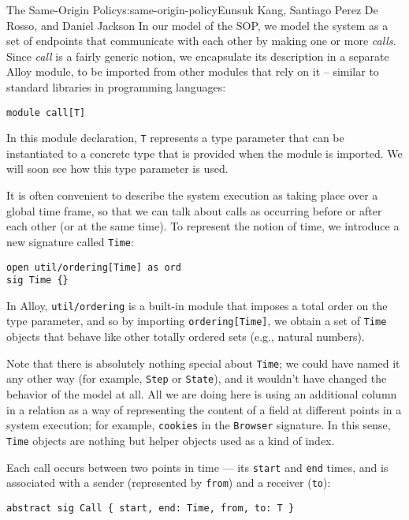 \begin{aosachapter}{The Same-Origin Policy}{s:same-origin-policy}{Eunsuk Kang, Santiago Perez De Rosso, and Daniel Jackson}
In our model of the SOP, we model the system as a set of endpoints that
communicate with each other by making one or more \emph{calls}. Since
\emph{call} is a fairly generic notion, we encapsulate its description
in a separate Alloy module, to be imported from other modules that rely
on it -- similar to standard libraries in programming languages:

\begin{verbatim}
module call[T] 
\end{verbatim}

In this module declaration, \texttt{T} represents a type parameter that
can be instantiated to a concrete type that is provided when the module
is imported. We will soon see how this type parameter is used.

It is often convenient to describe the system execution as taking place
over a global time frame, so that we can talk about calls as occurring
before or after each other (or at the same time). To represent the
notion of time, we introduce a new signature called \texttt{Time}:

\begin{verbatim}
open util/ordering[Time] as ord
sig Time {}
\end{verbatim}

In Alloy, \texttt{util/ordering} is a built-in module that imposes a
total order on the type parameter, and so by importing
\texttt{ordering{[}Time{]}}, we obtain a set of \texttt{Time} objects
that behave like other totally ordered sets (e.g., natural numbers).

Note that there is absolutely nothing special about \texttt{Time}; we
could have named it any other way (for example, \texttt{Step} or
\texttt{State}), and it wouldn't have changed the behavior of the model
at all. All we are doing here is using an additional column in a
relation as a way of representing the content of a field at different
points in a system execution; for example, \texttt{cookies} in the
\texttt{Browser} signature. In this sense, \texttt{Time} objects are
nothing but helper objects used as a kind of index.

Each call occurs between two points in time --- its \texttt{start} and
\texttt{end} times, and is associated with a sender (represented by
\texttt{from}) and a receiver (\texttt{to}):

\begin{verbatim}
abstract sig Call { start, end: Time, from, to: T } 
\end{verbatim}


\end{aosachapter}
